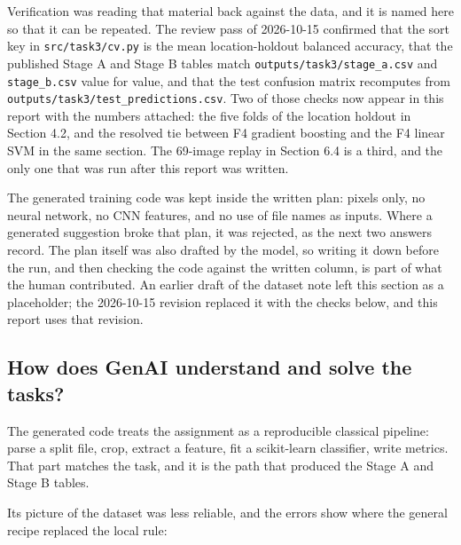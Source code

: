 \documentclass[11pt,a4paper]{article}
\begin{document}
Verification was reading that material back against the data, and it is named here so that it can be repeated. The review pass of 2026-10-15 confirmed that the sort key in \texttt{src/\allowbreak{}task3/\allowbreak{}cv.py} is the mean location-holdout balanced accuracy, that the published Stage A and Stage B tables match \texttt{outputs/\allowbreak{}task3/\allowbreak{}stage\_\allowbreak{}a.csv} and \texttt{stage\_\allowbreak{}b.csv} value for value, and that the test confusion matrix recomputes from \texttt{outputs/\allowbreak{}task3/\allowbreak{}test\_\allowbreak{}predictions.csv}. Two of those checks now appear in this report with the numbers attached: the five folds of the location holdout in Section 4.2, and the resolved tie between F4 gradient boosting and the F4 linear SVM in the same section. The 69-image replay in Section 6.4 is a third, and the only one that was run after this report was written.

The generated training code was kept inside the written plan: pixels only, no neural network, no CNN features, and no use of file names as inputs. Where a generated suggestion broke that plan, it was rejected, as the next two answers record. The plan itself was also drafted by the model, so writing it down before the run, and then checking the code against the written column, is part of what the human contributed. An earlier draft of the dataset note left this section as a placeholder; the 2026-10-15 revision replaced it with the checks below, and this report uses that revision.

\subsection{How does GenAI understand and solve the tasks?}\label{how-does-genai-understand-and-solve-the-tasks}

The generated code treats the assignment as a reproducible classical pipeline: parse a split file, crop, extract a feature, fit a scikit-learn classifier, write metrics. That part matches the task, and it is the path that produced the Stage A and Stage B tables.

Its picture of the dataset was less reliable, and the errors show where the general recipe replaced the local rule:
\end{document}
